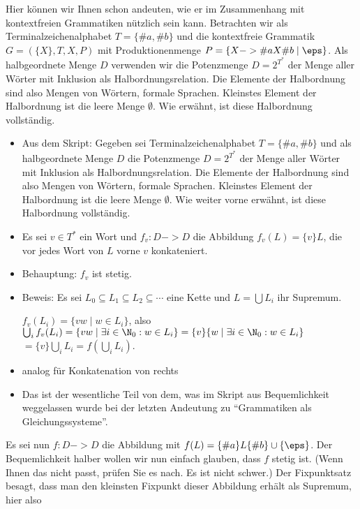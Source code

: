 Hier können wir Ihnen schon andeuten, wie er im Zusammenhang mit
kontextfreien Grammatiken nützlich sein kann. Betrachten wir als
Terminalzeichenalphabet $T=\{\#a,\#b\}$ und die kontextfreie Grammatik
$G=(\{X\},T,X,P)$ mit Produktionenmenge $P=\{X -> \#a X \#b \mid
\eps\}$.  Als halbgeordnete Menge $D$ verwenden wir die Potenzmenge
$D=2^{T^*}$ der Menge aller Wörter mit Inklusion als
Halbordnungsrelation. Die Elemente der Halbordnung sind also Mengen
von Wörtern, \dh formale Sprachen. Kleinstes Element der Halbordnung
ist die leere Menge $\emptyset$. Wie erwähnt, ist diese Halbordnung
vollständig.

\begin{tutorium}
  \begin{itemize}
  \item Aus dem Skript: Gegeben sei Terminalzeichenalphabet
    $T=\{\#a,\#b\}$ und als halbgeordnete Menge $D$ die Potenzmenge
    $D=2^{T^*}$ der Menge aller Wörter mit Inklusion als
    Halbordnungsrelation. Die Elemente der Halbordnung sind also
    Mengen von Wörtern, \dh formale Sprachen. Kleinstes Element der
    Halbordnung ist die leere Menge $\emptyset$. Wie weiter vorne
    erwähnt, ist diese Halbordnung vollständig.
  \item Es sei $v\in T^*$ ein Wort und $f_v:D->D$ die Abbildung
    $f_v(L)=\{v\}L$, die vor jedes Wort von $L$ vorne $v$
    konkateniert.
  \item Behauptung: $f_v$ ist stetig.
  \item Beweis: Es sei $L_0\subseteq L_1\subseteq L_2\subseteq
    \cdots$ eine Kette und $L=\bigcup L_i$ ihr Supremum.

    $f_v(L_i)=\{ vw\mid w\in L_i\}$, also $\bigcup_i f_v(L_i)=\{
    vw\mid \exists i\in\N_0: w\in L_i\} = \{v\}\{w \mid \exists
    i\in\N_0: w\in L_i\}$ $=\{v\}\bigcup_i L_i = f(\bigcup_i L_i)$.
  \item analog für Konkatenation von rechts
  \item Das ist der wesentliche Teil von dem, was im Skript aus
    Bequemlichkeit weggelassen wurde bei der letzten Andeutung zu
    "`Grammatiken als Gleichungssysteme"'.
  \end{itemize}
\end{tutorium}
Es sei nun $f:D->D$ die Abbildung mit $f(L)= \{\#a\}L\{\#b\}
\cup\{\eps\}$. Der Bequemlichkeit halber wollen wir nun einfach
glauben, dass $f$ stetig ist. (Wenn Ihnen das nicht passt, prüfen Sie
es nach. Es ist nicht schwer.) Der Fixpunktsatz besagt, dass man den
kleinsten Fixpunkt dieser Abbildung erhält als Supremum, hier also
